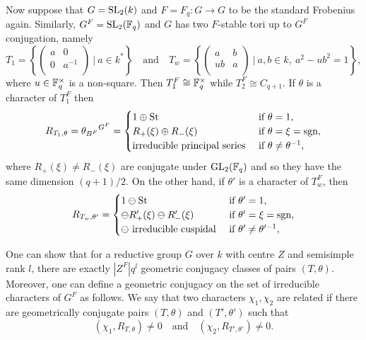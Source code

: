 \begin{example}
    Now suppose that $G=\mathrm{SL}_2(k)$ and $F=F_q:G\rightarrow G$ to be the standard Frobenius again. Similarly, $G^F=\mathrm{SL}_2(\mathbb{F}_q)$ and $G$ has two $F$-stable tori up to $G^F$ conjugation, namely
    \begin{equation*}
        T_1=\left\{\begin{pmatrix}
            a & 0\\
            0 & a^{-1}\\
        \end{pmatrix}\ |\ a\in k^*\right\}\quad\text{and}\quad T_w=\left\{\begin{pmatrix}
            a & b\\
            ub & a\\
        \end{pmatrix}\ |\ a,b\in k,\ a^2-ub^2=1\right\},
    \end{equation*}
    where $u\in\mathbb{F}_q^\times$ is a non-square. Then $T_1^F\cong \mathbb{F}_q^\times$ while $T_2^F\cong C_{q+1}$. If $\theta$ is a character of $T_1^F$ then
    $$R_{T_1,\theta}={\theta_{B^F}}^{G^F}=\begin{cases}
        1\oplus\mathrm{St} &\text{ if } \theta=1,\\
        R_+(\xi)\oplus R_-(\xi)&\text{ if }\theta=\xi=\mathrm{sgn},\\
        \text{irreducible principal series} & \text{ if }\theta\neq\theta^{-1},
    \end{cases}$$
    where $R_+(\xi)\neq R_-(\xi)$ are conjugate under $\mathrm{GL}_2(\mathbb{F}_
    q)$ and so they have the same dimension $(q+1)/2$. On the other hand, if $\theta'$ is a character of $T_w^F$, then
    $$R_{T_w,\theta'}=\begin{cases}
        1\ominus\mathrm{St} &\text{ if } \theta'=1,\\
        \ominus R'_+(\xi)\ominus R'_-(\xi)&\text{ if }\theta'=\xi=\mathrm{sgn},\\
        \ominus\text{ irreducible cuspidal} & \text{ if }\theta'\neq\theta'^{-1},
    \end{cases}$$
\end{example}

One can show that for a reductive group $G$ over $k$ with centre $Z$ and semisimple rank $l$, there are exactly $|Z^F|q^l$ geometric conjugacy classes of pairs $(T,\theta)$. Moreover, one can define a geometric conjugacy on the set of irreducible characters of $G^F$ as follows. We say that two characters $\chi_1,\chi_2$ are related if there are geometrically conjugate pairs $(T,\theta)$ and $(T',\theta')$ such that 
$$(\chi_1,R_{T,\theta})\neq0\quad\text{and}\quad(\chi_2,R_{T',\theta'})\neq 0.$$

